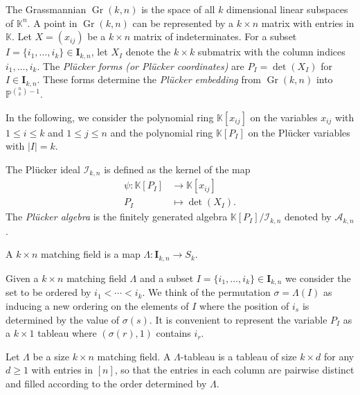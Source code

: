 \documentclass[ALCO,ThmDefs,Unicode,epreuves]{cedram}
\DeclareMathOperator{\Gr}{Gr}
\newcommand{\I}{\mathcal{I}}
\begin{document}
\smallskip

The Grassmannian $\Gr(k, n)$ is the space of all $k$ dimensional linear subspaces of $\mathbb{K}^n$. A point in $\Gr(k, n)$ can be represented by a $k\times n$ matrix with entries in $\mathbb{K}$. 
Let $X=(x_{ij})$ be a $k\times n$ matrix of indeterminates. For a subset $I = \{i_1,\ldots,i_k\} \in \mathbf{I}_{k, n}$, let $X_I$ denote the $k\times k$ submatrix with the column indices $i_1,\ldots,i_k$. 
The \emph{Pl{\"u}cker forms (or Pl{\"u}cker coordinates)} are $P_I = \det (X_I)$ for $I \in\mathbf{I}_{k, n}$. These forms determine the \emph{Pl{\"u}cker embedding} from
$ \Gr (k,n)$ into $\mathbb{P}^{\binom{n}{k}-1}$. 

In the following, we consider the polynomial ring $\mathbb{K}[x_{ij}]$ on the variables $x_{ij}$ with $1\leq i\leq k$ and $1\leq j\leq n$ and the polynomial ring $\mathbb{K}[P_I]$ on the Pl{\"u}cker variables with $|I|=k$.

\begin{Definition}\label{def:ideal}The Pl{\"u}cker ideal $\I_{k,n}$ is defined as the kernel of the map 
\begin{equation}\label{eqn:pluckermap}
\begin{aligned} 
\psi \colon \mathbb{K}[P_I] &\rightarrow \mathbb{K}[x_{ij}] 
\\ 
 P_{I} &\mapsto \det (X_I).
\end{aligned}
\end{equation}
The \emph{Pl{\"u}cker algebra} is the finitely generated algebra $\mathbb{K}[P_I ]/{\mathcal{I}_{k,n}}$ 
denoted by $\mathcal{A}_{k,n}$.
\end{Definition}




\begin{Definition}\label{def:matching}
A $k\times n$ matching field is a map $\Lambda: \mathbf{I}_{k,n} \to S_k$.
\end{Definition}

Given a $k\times n$ matching field $\Lambda$ and a subset $I = \{i_1, \ldots , i_k\} \in \mathbf{I}_{k, n}$ 
we consider the set to be ordered by $i_1 < \cdots < i_{k}$. We think of the permutation {$\sigma=\Lambda(I)$} as inducing a new ordering on the elements of $I$ 
where the position of $i_s$ is determined by the value of $\sigma(s)$.
It is convenient to represent the variable $P_I$ as a $k \times 1$ tableau 
 where $(\sigma(r), 1)$ contains $i_{r}$.

\begin{Definition}
Let $\Lambda$ be a size $k \times n$ matching field. 
A $\Lambda$-tableau is a tableau of size $k \times d$ for any $d\geq 1$ with entries in $[n]$,
so that the entries in each column are pairwise distinct and filled according to the order determined by $\Lambda$. 
\end{Definition}
\end{document}
